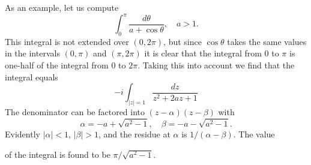 As an example, let us compute
\begin{equation*}
\int_ {0} ^ {\pi} \frac {d \theta}{a + \cos \theta}, \quad a > 1.
\end{equation*}
This integral is not extended over $(0,2\pi)$, but since $\cos\theta$ takes the same values in the intervals $(0,\pi)$ and $(\pi,2\pi)$ it is clear that the integral from 0 to $\pi$ is one-half of the integral from 0 to $2\pi$. Taking this into account we find that the integral equals
\begin{equation*}
- i \int_ {| z | = 1} \frac {d z}{z ^ {2} + 2 a z + 1}
\end{equation*}
The denominator can be factored into $(z - \alpha)(z - \beta)$ with
\begin{equation*}
\alpha = - a + \sqrt {a ^ {2} - 1}, \quad \beta = - a - \sqrt {a ^ {2} - 1}.
\end{equation*}
Evidently $|\alpha| < 1$, $|\beta| > 1$, and the residue at $\alpha$ is $1 / (\alpha - \beta)$. The value


of the integral is found to be $\pi/\sqrt{a^{2}-1}$.

